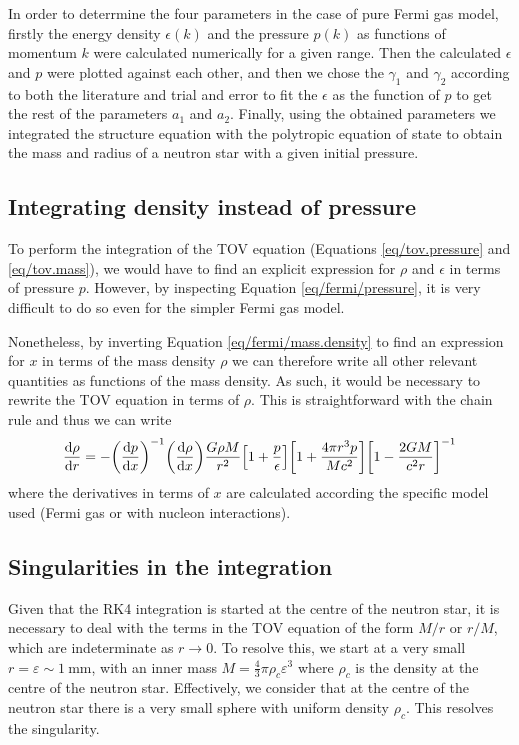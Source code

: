 \documentclass[draft,11pt]{article}
\theoremstyle{definition}
\theoremstyle{remark}
\begin{document}
            In order to deterrmine the four parameters in the case of pure Fermi gas model, firstly the energy density $\epsilon(k)$ and the pressure $p(k)$ as functions of momentum $k$ were calculated numerically for a given range. Then the calculated $\epsilon$ and $p$ were plotted against each other, and then we chose the $\gamma_1$ and $\gamma_2$ according to both the literature and trial and error to fit the $\epsilon$ as the function of $p$ to get the rest of the parameters $a_1$ and $a_2$. Finally, using the obtained parameters we integrated the structure equation with the polytropic equation of state to obtain the mass and radius of a neutron star with a given initial pressure.

        \subsection{Integrating density instead of pressure}
            To perform the integration of the TOV equation (Equations \ref{eq/tov.pressure} and \ref{eq/tov.mass}), we would have to find an explicit expression for $\rho$ and $\epsilon$ in terms of pressure $p$. However, by inspecting Equation \ref{eq/fermi/pressure}, it is very difficult to do so even for the simpler Fermi gas model.
            
            Nonetheless, by inverting Equation \ref{eq/fermi/mass.density} to find an expression for $x$ in terms of the mass density $\rho$ we can therefore write all other relevant quantities as functions of the mass density. As such, it would be necessary to rewrite the TOV equation in terms of $\rho$. This is straightforward with the chain rule and thus we can write \begin{equation}\label{eq/tov.density}\dv{\rho}{r}=-\qty(\dv{p}{x})^{-1}\qty(\dv{\rho}{x})\frac{G\rho M}{r^{2}}\qty[1+\frac{p}{\epsilon}]\qty[1+\frac{4\pi r^{3}p}{Mc^{2}}]\qty[1-\frac{2GM}{c^{2}r}]^{-1}\end{equation} where the derivatives in terms of $x$ are calculated according the specific model used (Fermi gas or with nucleon interactions).
            
        \subsection{Singularities in the integration}
            Given that the RK4 integration is started at the centre of the neutron star, it is necessary to deal with the terms in the TOV equation of the form $M/r$ or $r/M$, which are indeterminate as $r\to0$. To resolve this, we start at a very small $r=\varepsilon\sim\SI{1}{\milli\meter}$, with an inner mass $M=\frac{4}{3}\pi\rho_{c}\varepsilon^{3}$ where $\rho_{c}$ is the density at the centre of the neutron star. Effectively, we consider that at the centre of the neutron star there is a very small sphere with uniform density $\rho_{c}$. This resolves the singularity.
            
\end{document}
